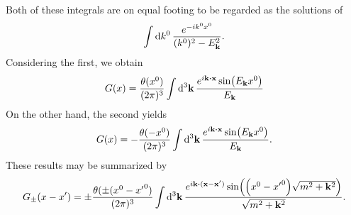 \documentclass{article}
\begin{document}
Both of these integrals are on equal footing to be regarded as the solutions of
\begin{equation}
\int\dd{k^0}\frac{e^{-ik^0x^0}}{(k^0)^2-E_{\vb{k}}^2}.
\end{equation}
Considering the first, we obtain
\begin{equation}
G(x)=\frac{\theta(x^0)}{(2\pi)^3}\int \dd[3]{\vb{k}}\frac{e^{i\vb{k}\vdot\vb{x}}\sin(E_{\vb{k}}x^0)}{E_{\vb{k}}}
\end{equation}
On the other hand, the second yields
\begin{equation}
G(x)=-\frac{\theta(-x^0)}{(2\pi)^3}\int \dd[3]{\vb{k}}\frac{e^{i\vb{k}\vdot\vb{x}}\sin(E_{\vb{k}}x^0)}{E_{\vb{k}}}.
\end{equation}
These results may be summarized by
\begin{equation*}
G_\pm(x-x')=\pm\frac{\theta(\pm (x^0-{x'}^0)}{(2\pi)^3}\int \dd[3]{\vb{k}}\frac{e^{i\vb{k}\vdot(\vb{x}-\vb{x'})}\sin(\qty(x^0-{x'}^0)\sqrt{m^2+\vb{k}^2})}{\sqrt{m^2+\vb{k}^2}}.
\end{equation*}
\end{document}
